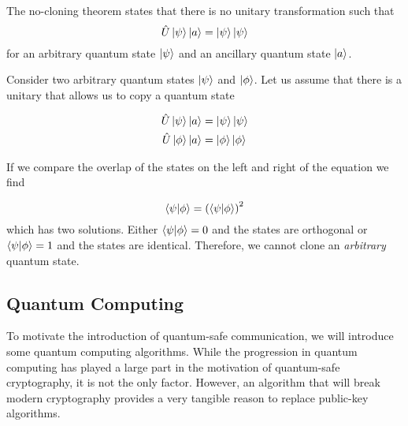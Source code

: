 
\begin{theorem}
	 The no-cloning theorem states that there is no unitary transformation such that
	 \begin{equation}
	 	\hat{U}\ket{\psi}\ket{a} = \ket{\psi}\ket{\psi}
	 \end{equation}
	 for an arbitrary quantum state $\ket{\psi}$ and an ancillary quantum state $\ket{a}$.
\end{theorem}

Consider two arbitrary quantum states $\ket{\psi}$ and $\ket{\phi}$. Let us assume that there is a unitary that allows us to copy a quantum state

\begin{align}
	\hat{U}\ket{\psi}\ket{a} &= \ket{\psi}\ket{\psi}\\
	\hat{U}\ket{\phi}\ket{a} &= \ket{\phi}\ket{\phi}
\end{align}

If we compare the overlap of the states on the left and right of the equation we find

\begin{equation}
	\braket{\psi|\phi} = \left(\braket{\psi|\phi}\right)^2
\end{equation}
which has two solutions. Either $\braket{\psi|\phi} = 0$ and the states are orthogonal or $\braket{\psi|\phi} = 1$ and the states are identical. Therefore, we cannot clone an \emph{arbitrary} quantum state.

\subsection{Quantum Computing}

To motivate the introduction of quantum-safe communication, we will introduce some quantum computing algorithms. While the progression in quantum computing has played a large part in the motivation of quantum-safe cryptography, it is not the only factor. However, an algorithm that will break modern cryptography provides a very tangible reason to replace public-key algorithms.


